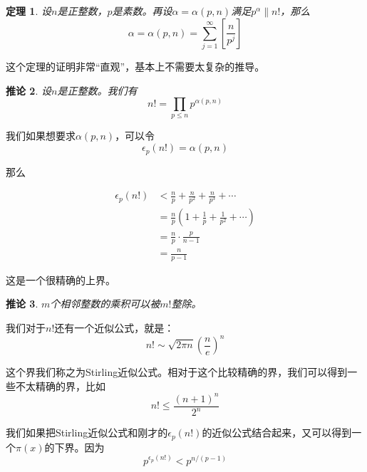 \documentclass{ctexrep}
\newtheorem{thrm}{定理}[section]
\newtheorem{coro}[thrm]{推论}
\begin{document}
\begin{thrm}
设$n$是正整数，$p$是素数。再设$\alpha=\alpha(p,n)$满足$p^\alpha\parallel n!$，那么
\begin{displaymath}
\alpha=\alpha(p,n)=\sum_{j=1}^\infty \left[ \frac{n}{p^j} \right]
\end{displaymath}
\end{thrm}

这个定理的证明非常“直观”，基本上不需要太复杂的推导。

\begin{coro}
设$n$是正整数。我们有
\begin{displaymath}
n!=\prod_{p\leq n} p^{\alpha(p,n)}
\end{displaymath}
\end{coro}

我们如果想要求$\alpha(p,n)$，可以令
\begin{displaymath}
\epsilon_p(n!)=\alpha(p,n)
\end{displaymath}

那么

\begin{align}
\epsilon_p(n!)&<\frac{n}{p}+\frac{n}{p^2}+\frac{n}{p^3}+\dotsb\nonumber\\
              &=\frac{n}{p}\left(1+\frac{1}{p}+\frac{1}{p^2}+\dotsb\right)\nonumber\\
              &=\frac{n}{p}\cdot\frac{p}{n-1}\nonumber\\
              &=\frac{n}{p-1}
\end{align}

这是一个很精确的上界。

\begin{coro}
$m$个相邻整数的乘积可以被$m!$整除。
\end{coro}

我们对于$n!$还有一个近似公式，就是：
\begin{displaymath}
n!\sim \sqrt{2\pi n}\left(\frac{n}{e}\right)^n
\end{displaymath}

这个界我们称之为Stirling近似公式。相对于这个比较精确的界，我们可以得到一些不太精确的界，比如
\begin{displaymath}
n!\leq \frac{(n+1)^n}{2^n}
\end{displaymath}

我们如果把Stirling近似公式和刚才的$\epsilon_p(n!)$的近似公式结合起来，又可以得到一个$\pi(x)$的下界。因为
\begin{displaymath}
p^{\epsilon_p(n!)}<p^{n/(p-1)}
\end{displaymath}
\end{document}
